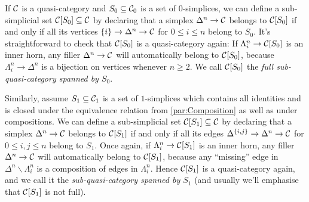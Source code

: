\begin{numpar}\label{par:SubQuasiCategories}
	If $\mathcal{C}$ is a quasi-category and $S_0\subseteq \mathcal{C}_0$ is a set of $0$-simplices, we can define a sub-simplicial set $\mathcal{C}[S_0]\subseteq \mathcal{C}$ by declaring that a simplex $\Delta^n\rightarrow \mathcal{C}$ belongs to $\mathcal{C}[S_0]$ if and only if all its vertices $\{i\}\rightarrow\Delta^n\rightarrow\mathcal{C}$ for $0\leqslant i\leqslant n$ belong to $S_0$. It's straightforward to check that $\mathcal{C}[S_0]$ is a quasi-category again: If $\Lambda_i^n\rightarrow \mathcal{C}[S_0]$ is an inner horn, any filler $\Delta^n\rightarrow\mathcal{C}$ will automatically belong to $\mathcal{C}[S_0]$, because $\Lambda_i^n\rightarrow\Delta^n$ is a bijection on vertices whenever $n\geqslant 2$. We call $\mathcal{C}[S_0]$ the \emph{full sub-quasi-category spanned by $S_0$}.\label{enum:SubQuasiCategories}
	
	Similarly, assume $S_1\subseteq \mathcal{C}_1$ is a set of $1$-simplices which contains all identities and is closed under the equivalence relation from \cref{par:Composition} as well as under compositions. We can define a sub-simplicial set $\mathcal{C}[S_1]\subseteq \mathcal{C}$ by declaring that a simplex $\Delta^n\rightarrow \mathcal{C}$ belongs to $\mathcal{C}[S_1]$ if and only if all its edges $\Delta^{\{i,j\}}\rightarrow\Delta^n\rightarrow\mathcal{C}$ for $0\leqslant i,j\leqslant n$ belong to $S_1$. Once again, if $\Lambda_i^n\rightarrow \mathcal{C}[S_1]$ is an inner horn, any filler $\Delta^n\rightarrow\mathcal{C}$ will automatically belong to $\mathcal{C}[S_1]$, because any \enquote{missing} edge in $\Delta^n\smallsetminus \Lambda_i^n$ is a composition of edges in $\Lambda_i^n$. Hence $\mathcal{C}[S_1]$ is a quasi-category again, and we call it the \emph{sub-quasi-category spanned by $S_1$} (and usually we'll emphasise that $\mathcal{C}[S_1]$ is not full).
\end{numpar}

